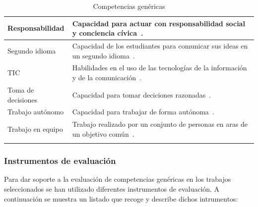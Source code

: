 \begin{landscape}
\begin{center}
\begin{longtable}{| m{6cm} | m{16cm} |}
    \hline
    Responsabilidad & Capacidad para actuar con responsabilidad social y conciencia cívica~\cite{gonzalez2003tuning}. \\
    \hline 
    Segundo idioma & Capacidad de los estudiantes para comunicar sus ideas en un segundo idioma~\cite{gass2013second}. \\
    \hline
    TIC & Habilidades en el uso de las tecnologías de la información y de la comunicación~\cite{gonzalez2003tuning}. \\
    \hline
    Toma de decisiones & Capacidad para tomar deciciones razonadas~\cite{gonzalez2003tuning}. \\
    \hline
    Trabajo autónomo & Capacidad para trabajar de forma autónoma~\cite{gonzalez2003tuning}. \\
    \hline
    Trabajo en equipo & Trabajo realizado por un conjunto de personas en aras de un objetivo común~\cite{parker1990teamwork}. \\
    \hline
\caption{Competencias genéricas}
\label{tab:CompetenciasGenericas}
\end{longtable} 
\end{center}
\end{landscape}
\pagestyle{fancy}

\subsubsection{Instrumentos de evaluación}

Para dar soporte a la evaluación de competencias genéricas en los trabajos seleccionados se han utilizado diferentes instrumentos de evaluación. A continuación se muestra un listado que recoge y describe dichos intrumentos:

